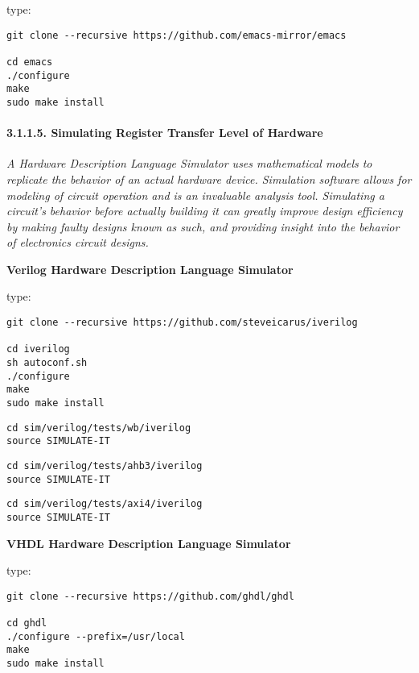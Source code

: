 \documentclass[]{article}
\let\oldparagraph\paragraph
\renewcommand{\paragraph}[1]{\oldparagraph{#1}\mbox{}}
\begin{document}
type:

\begin{verbatim}
git clone --recursive https://github.com/emacs-mirror/emacs

cd emacs
./configure
make
sudo make install
\end{verbatim}

\paragraph{3.1.1.5. Simulating Register Transfer Level of
Hardware}\label{simulating-register-transfer-level-of-hardware}

\emph{A Hardware Description Language Simulator uses mathematical models
to replicate the behavior of an actual hardware device. Simulation
software allows for modeling of circuit operation and is an invaluable
analysis tool. Simulating a circuit's behavior before actually building
it can greatly improve design efficiency by making faulty designs known
as such, and providing insight into the behavior of electronics circuit
designs.}

\textbf{Verilog Hardware Description Language Simulator}

type:

\begin{verbatim}
git clone --recursive https://github.com/steveicarus/iverilog

cd iverilog
sh autoconf.sh
./configure
make
sudo make install
\end{verbatim}

\begin{verbatim}
cd sim/verilog/tests/wb/iverilog
source SIMULATE-IT
\end{verbatim}

\begin{verbatim}
cd sim/verilog/tests/ahb3/iverilog
source SIMULATE-IT
\end{verbatim}

\begin{verbatim}
cd sim/verilog/tests/axi4/iverilog
source SIMULATE-IT
\end{verbatim}

\textbf{VHDL Hardware Description Language Simulator}

type:

\begin{verbatim}
git clone --recursive https://github.com/ghdl/ghdl

cd ghdl
./configure --prefix=/usr/local
make
sudo make install
\end{verbatim}
\end{document}
